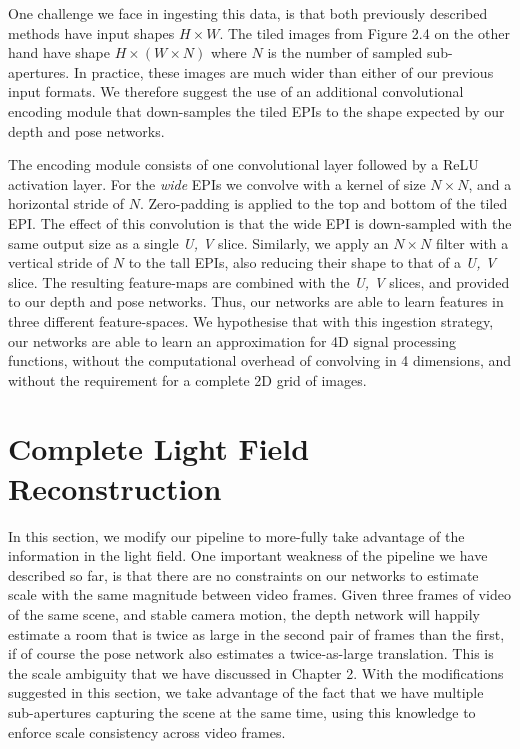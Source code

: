 \newpage

One challenge we face in ingesting this data, is that both previously described methods have input shapes $H \times W$. The tiled images from Figure 2.4 on the other hand have shape $H \times (W \times N)$ where $N$ is the number of sampled sub-apertures. In practice, these images are much wider than either of our previous input formats. We therefore suggest the use of an additional convolutional encoding module that down-samples the tiled EPIs to the shape expected by our depth and pose networks.

The encoding module consists of one convolutional layer followed by a ReLU activation layer. For the \textit{wide} EPIs we convolve with a kernel of size $N \times N$, and a horizontal stride of $N$. Zero-padding is applied to the top and bottom of the tiled EPI. The effect of this convolution is that the wide EPI is down-sampled with the same output size as a single \textit{U, V} slice. Similarly, we apply an $N \times N$ filter with a vertical stride of $N$ to the tall EPIs, also reducing their shape to that of a \textit{U, V} slice. The resulting feature-maps are combined with the \textit{U, V} slices, and provided to our depth and pose networks. Thus, our networks are able to learn features in three different feature-spaces. We hypothesise that with this ingestion strategy, our networks are able to learn an approximation for 4D signal processing functions, without the computational overhead of convolving in 4 dimensions, and without the requirement for a complete 2D grid of images.


\section{Complete Light Field Reconstruction}



In this section, we modify our pipeline to more-fully take advantage of the information in the light field. One important weakness of the pipeline we have described so far, is that there are no constraints on our networks to estimate scale with the same magnitude between video frames. Given three frames of video of the same scene, and stable camera motion, the depth network will happily estimate a room that is twice as large in the second pair of frames than the first, if of course the pose network also estimates a twice-as-large translation. This is the scale ambiguity that we have discussed in Chapter 2. With the modifications suggested in this section, we take advantage of the fact that we have multiple sub-apertures capturing the scene at the same time, using this knowledge to enforce scale consistency across video frames. 

